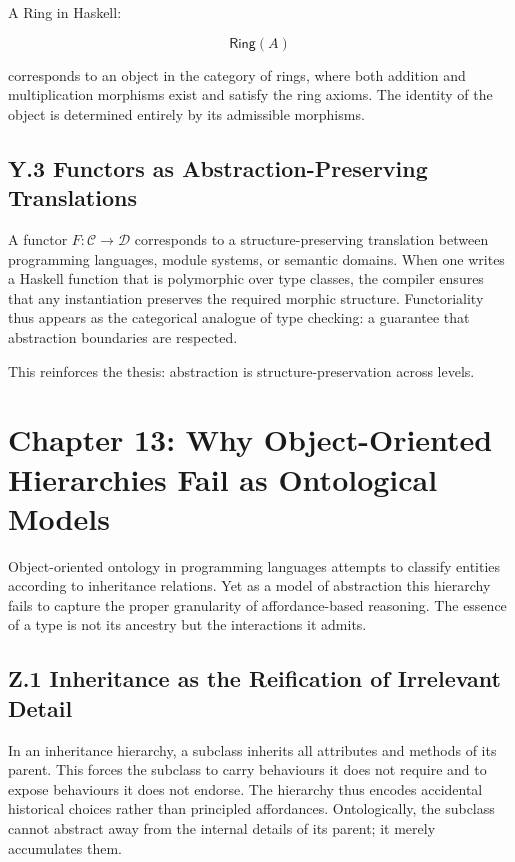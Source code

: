 \documentclass[12pt,letterpaper]{article}
\theoremstyle{remark}
\begin{document}
A Ring in Haskell:

\[
\mathsf{Ring}(A)
\]

corresponds to an object in the category of rings, where both addition and multiplication morphisms exist and satisfy the ring axioms. The identity of the object is determined entirely by its admissible morphisms.

\subsection{Y.3 Functors as Abstraction-Preserving Translations}

A functor \(F : \mathcal{C} \to \mathcal{D}\) corresponds to a structure-preserving translation between programming languages, module systems, or semantic domains. When one writes a Haskell function that is polymorphic over type classes, the compiler ensures that any instantiation preserves the required morphic structure. Functoriality thus appears as the categorical analogue of type checking: a guarantee that abstraction boundaries are respected.

This reinforces the thesis: abstraction is structure-preservation across levels.

\newpage

\section{Chapter 13: Why Object-Oriented Hierarchies Fail as Ontological Models}

Object-oriented ontology in programming languages attempts to classify entities according to inheritance relations. Yet as a model of abstraction this hierarchy fails to capture the proper granularity of affordance-based reasoning. The essence of a type is not its ancestry but the interactions it admits.

\subsection{Z.1 Inheritance as the Reification of Irrelevant Detail}

In an inheritance hierarchy, a subclass inherits all attributes and methods of its parent. This forces the subclass to carry behaviours it does not require and to expose behaviours it does not endorse. The hierarchy thus encodes accidental historical choices rather than principled affordances. Ontologically, the subclass cannot abstract away from the internal details of its parent; it merely accumulates them.
\end{document}
